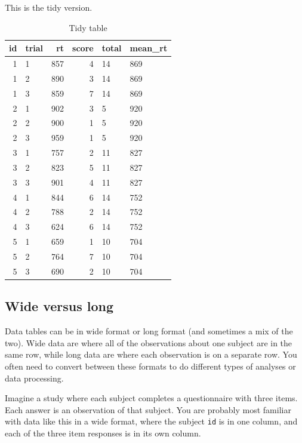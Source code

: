 \documentclass[
  oneside]{book}
\begin{document}
This is the tidy version.

\begin{table}

\caption{\label{tab:unnamed-chunk-1}Tidy table}
\centering
\begin{tabular}[t]{r|l|r|r|l|l}
\hline
id & trial & rt & score & total & mean\_rt\\
\hline
1 & 1 & 857 & 4 & 14 & 869\\
\hline
1 & 2 & 890 & 3 & 14 & 869\\
\hline
1 & 3 & 859 & 7 & 14 & 869\\
\hline
2 & 1 & 902 & 3 & 5 & 920\\
\hline
2 & 2 & 900 & 1 & 5 & 920\\
\hline
2 & 3 & 959 & 1 & 5 & 920\\
\hline
3 & 1 & 757 & 2 & 11 & 827\\
\hline
3 & 2 & 823 & 5 & 11 & 827\\
\hline
3 & 3 & 901 & 4 & 11 & 827\\
\hline
4 & 1 & 844 & 6 & 14 & 752\\
\hline
4 & 2 & 788 & 2 & 14 & 752\\
\hline
4 & 3 & 624 & 6 & 14 & 752\\
\hline
5 & 1 & 659 & 1 & 10 & 704\\
\hline
5 & 2 & 764 & 7 & 10 & 704\\
\hline
5 & 3 & 690 & 2 & 10 & 704\\
\hline
\end{tabular}
\end{table}

\hypertarget{wide_long}{%
\subsection{Wide versus long}\label{wide_long}}

Data tables can be in wide format or long format (and sometimes a mix of the two). Wide data are where all of the observations about one subject are in the same row, while long data are where each observation is on a separate row. You often need to convert between these formats to do different types of analyses or data processing.

Imagine a study where each subject completes a questionnaire with three items. Each answer is an observation of that subject. You are probably most familiar with data like this in a wide format, where the subject \texttt{id} is in one column, and each of the three item responses is in its own column.
\end{document}
